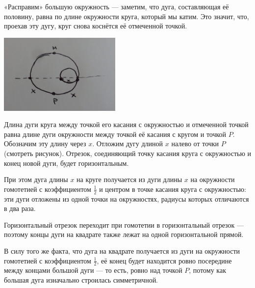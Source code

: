 \begin{itemize}
\itA «Расправим» большую окружность — заметим, что дуга, составляющая её половину, равна по длине окружности круга, который мы катим. Это значит, что, проехав эту дугу, круг снова коснётся её отмеченной точкой.

\begin{center}
	\includegraphics[natwidth=2614,natheight=1716,width=6cm]{figures/2018-circle-move}
\end{center}

\itB Длина дуги круга между точкой его касания с окружностью и отмеченной точкой равна длине дуги окружности между точкой её касания с кругом и точкой $P$. Обозначим эту длину через $x$. Отложим дугу длиной $x$ налево от точки $P$ (смотреть рисунок). Отрезок, соединяющий точку касания круга с окружностью и конец новой дуги, будет горизонтальным.

При этом дуга длины $x$ на круге получается из дуги длины $x$ на окружности гомотетией с коэффициентом $\tfrac{1}{2}$ и центром в точке касания круга с окружностью: эти дуги отложены из одной точки на окружностях, радиусы которых отличаются в два раза.

Горизонтальный отрезок переходит при гомотетии в горизонтальный отрезок — поэтому концы дуги на квадрате также лежат на одной горизонтальной прямой.

\itC В силу того же факта, что дуга на квадрате получается из дуги на окружности гомотетией с коэффициентом $\tfrac{1}{2}$, её конец будет находится ровно посередине между концами большой дуги — то есть, ровно над точкой $P$, потому как большая дуга изначально строилась симметричной.
\end{itemize}